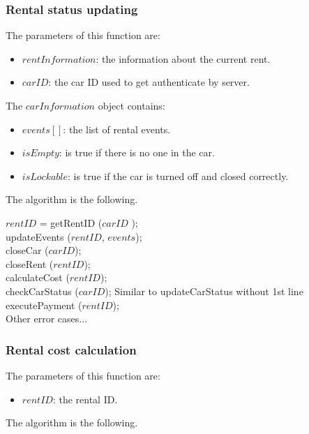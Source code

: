 \subsubsection{Rental status updating}

The parameters of this function are:
\begin{itemize}
	\item $rentInformation$: the information about the current rent.
	\item $carID$: the car ID used to get authenticate by server.
\end{itemize}
The $carInformation$ object contains:
\begin{itemize}
	\item $events[]$: the list of rental events.
	\item $isEmpty$: is true if there is no one in the car.
	\item $isLockable$: is true if the car is turned off and closed correctly.
\end{itemize}
The algorithm is the following.

\bigskip

\begin{algorithm}[H]
\small
	$rentID$ = {\color{blue} getRentID} ($carID$ ); \\
	{
		{\color{blue}updateEvents} ($rentID$, $events$); \\
	}
	{
		{
			{\color{blue}closeCar} ($carID$); \\
			{\color{blue}closeRent} ($rentID$); \\
			{\color{green}calculateCost} ($rentID$); \\
			{\color{blue}checkCarStatus} ($carID$);  \/\/Similar to updateCarStatus without 1st line \\
			{\color{blue}executePayment} ($rentID$); \\
		}
	} 
	Other error cases...
\end{algorithm}

\subsubsection{Rental cost calculation}

The parameters of this function are:
\begin{itemize}
	\item $rentID$: the rental ID.
\end{itemize}
The algorithm is the following.
\bigskip

